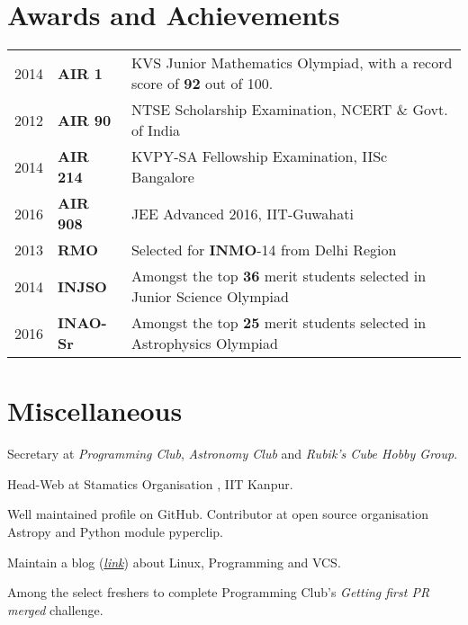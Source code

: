 \documentclass[]{deedy-resume-openfont}
\begin{document}
\begin{minipage}[t]{0.66\textwidth}
\section{Awards and Achievements} 
\begin{tabular}{rll}
  2014	   & \textbf{AIR 1}  & KVS Junior Mathematics Olympiad, with a record score of \textbf{92} out of 100. \\
  2012	   & \textbf{AIR 90} & NTSE Scholarship Examination, NCERT \& Govt. of India \\
  2014	   & \textbf{AIR 214}& KVPY-SA Fellowship Examination, IISc Bangalore \\
  2016     & \textbf{AIR 908}& JEE Advanced 2016, IIT-Guwahati \\
  2013	    & \textbf{RMO}     & Selected for \textbf{INMO}-14 from Delhi Region \\
  2014	    & \textbf{INJSO}   & Amongst the top \textbf{36} merit students selected in Junior Science Olympiad   \\
  2016      & \textbf{INAO-Sr} & Amongst the top \textbf{25} merit students selected in Astrophysics Olympiad  \\
\end{tabular}

\vspace{1 cm}

\section{Miscellaneous}
\vspace{\topsep}
\begin{tightemize}
\item Secretary at \emph{Programming Club}, \emph{Astronomy Club} and \emph{Rubik's Cube Hobby Group}.
\item Head-Web at Stamatics Organisation , IIT Kanpur.
\item Well maintained profile on GitHub. Contributor at open source organisation Astropy and Python module pyperclip.
\item Maintain a blog (\textit{\href{http://aniketpandey.com/homepage}{link}}) about Linux, Programming and VCS.
\item Among the select freshers to complete Programming Club's \textit{Getting first PR merged} challenge. 
\end{tightemize}
\end{minipage} 
\end{document}
